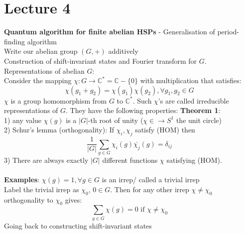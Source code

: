 \documentclass{article}
\begin{document}
\section{Lecture 4}
\textbf{Quantum algorithm for finite abelian HSPs}
- Generalisation of period-finding algorithm\\
Write our abelian group $(G, +)$ additively\\
Construction of shift-invariant states and Fourier transform for $G$.\\
Representations of abelian $G$:\\
Consider the mapping $\chi: G \rightarrow \mathbb{C}^* = \mathbb{C}- \{ 0\}$ with multiplication that satisfies:
$$
\chi( g_1 + g_2) = \chi(g_1) \chi(g_2), \forall g_1,g_2 \in G 
$$
$\chi$ is a group homomorphism from $G$ to $\mathbb{C}^*$. Such $\chi$'s are called irreducible representations of $G$. They have the following properties:
\textbf{Theorem 1}:\\
1) any value $\chi(g)$ is a $|G|$-th root of unity ($\chi \in \rightarrow S^1$ the unit circle)\\
2) Schur's lemma (orthogonality): If $\chi_i,\chi_j$ satisfy (HOM) then 
$$
\frac{1}{|G|} \sum_{g \in G} \chi_i (g) \bar {\chi_j} (g) = \delta_{ij}
$$
3) There are always exactly $|G|$ different functions $\chi$ satisfying (HOM).\\\\
\textbf{Examples}: $\chi(g) = 1, \forall g \in G$ is an irrep/ called a trivial irrep\\
Label the trivial irrep as $\chi_0$, $0\in G$. Then for any other irrep $\chi \neq \chi_0$ orthogonality to $\chi_0$ gives:
$$
\sum_{g \in G} \chi(g) = 0 \text{ if } \chi \neq \chi_0
$$
Going back to constructing shift-invariant states
\end{document}
